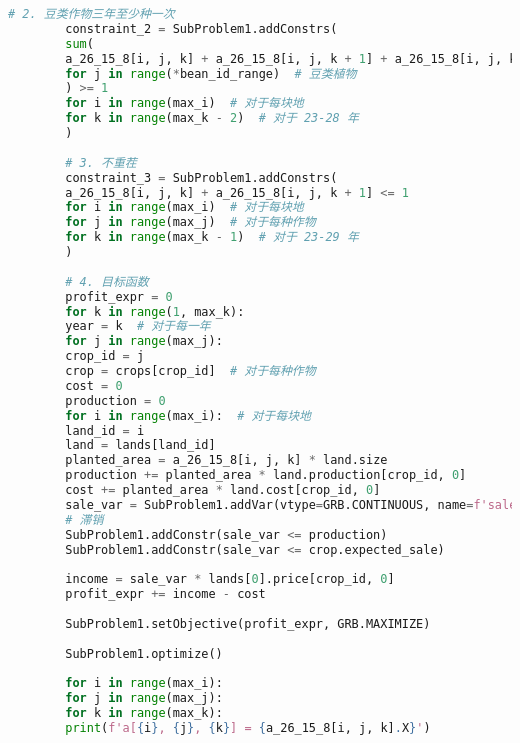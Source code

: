 \documentclass[a4paper]{article}
\begin{document}
\begin{lstlisting}[language=python,columns=fullflexible,frame=shadowbox]
		# 2. 豆类作物三年至少种一次
		constraint_2 = SubProblem1.addConstrs(
		sum(
		a_26_15_8[i, j, k] + a_26_15_8[i, j, k + 1] + a_26_15_8[i, j, k + 2]  # 连续三年之和
		for j in range(*bean_id_range)  # 豆类植物
		) >= 1
		for i in range(max_i)  # 对于每块地
		for k in range(max_k - 2)  # 对于 23-28 年
		)
		
		# 3. 不重茬
		constraint_3 = SubProblem1.addConstrs(
		a_26_15_8[i, j, k] + a_26_15_8[i, j, k + 1] <= 1
		for i in range(max_i)  # 对于每块地
		for j in range(max_j)  # 对于每种作物
		for k in range(max_k - 1)  # 对于 23-29 年
		)
		
		# 4. 目标函数
		profit_expr = 0
		for k in range(1, max_k):
		year = k  # 对于每一年
		for j in range(max_j):
		crop_id = j
		crop = crops[crop_id]  # 对于每种作物
		cost = 0
		production = 0
		for i in range(max_i):  # 对于每块地
		land_id = i
		land = lands[land_id]
		planted_area = a_26_15_8[i, j, k] * land.size
		production += planted_area * land.production[crop_id, 0]
		cost += planted_area * land.cost[crop_id, 0]
		sale_var = SubProblem1.addVar(vtype=GRB.CONTINUOUS, name=f'sale_{i}_{j}_{k}')
		# 滞销
		SubProblem1.addConstr(sale_var <= production)
		SubProblem1.addConstr(sale_var <= crop.expected_sale)
		
		income = sale_var * lands[0].price[crop_id, 0]
		profit_expr += income - cost
		
		SubProblem1.setObjective(profit_expr, GRB.MAXIMIZE)
		
		SubProblem1.optimize()
		
		for i in range(max_i):
		for j in range(max_j):
		for k in range(max_k):
		print(f'a[{i}, {j}, {k}] = {a_26_15_8[i, j, k].X}')
		
	\end{lstlisting}
	
\end{document}
